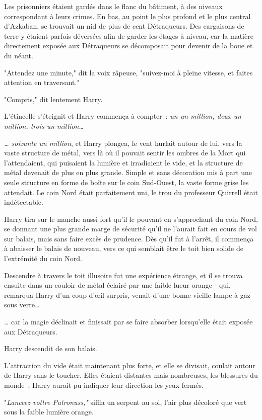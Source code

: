 Les prisonniers étaient gardés dans le flanc du bâtiment, à des niveaux correspondant à leurs crimes. En bas, au point le plus profond et le plus central d'Azkaban, se trouvait un nid de plus de cent Détraqueurs. Des cargaisons de terre y étaient parfois déversées afin de garder les étages à niveau, car la matière directement exposée aux Détraqueurs se décomposait pour devenir de la boue et du néant.

"Attendez une minute," dit la voix râpeuse, "suivez-moi à pleine vitesse, et faites attention en traversant."

"Compris," dit lentement Harry.

L'étincelle s'éteignit et Harry commença à compter~: \emph{un un million, deux un million, trois un million…}

\emph{… soixante un million}, et Harry plongea, le vent hurlait autour de lui, vers la vaste structure de métal, vers là où il pouvait sentir les ombres de la Mort qui l'attendaient, qui puisaient la lumière et irradiaient le vide, et la structure de métal devenait de plus en plus grande. Simple et sans décoration mis à part une seule structure en forme de boîte sur le coin Sud-Ouest, la vaste forme grise les attendait. Le coin Nord était parfaitement uni, le trou du professeur Quirrell était indétectable.

Harry tira sur le manche aussi fort qu'il le pouvant en s'approchant du coin Nord, se donnant une plus grande marge de sécurité qu'il ne l'aurait fait en cours de vol sur balais, mais sans faire excès de prudence. Dès qu'il fut à l'arrêt, il commença à abaisser le balais de nouveau, vers ce qui semblait être le toit bien solide de l'extrémité du coin Nord.

Descendre à travers le toit illusoire fut une expérience étrange, et il se trouva ensuite dans un couloir de métal éclairé par une faible lueur orange - qui, remarqua Harry d'un coup d'œil surpris, venait d'une bonne vieille lampe à gaz sous verre…

… car la magie déclinait et finissait par se faire absorber lorsqu'elle était exposée aux Détraqueurs.

Harry descendit de son balais.

L'attraction du vide était maintenant plus forte, et elle se divisait, coulait autour de Harry sans le toucher. Elles étaient distantes mais nombreuses, les blessures du monde~; Harry aurait pu indiquer leur direction les yeux fermés.

"\emph{Lanccez vottre Patronuss,"} siffla un serpent au sol, l'air plus décoloré que vert sous la faible lumière orange.

